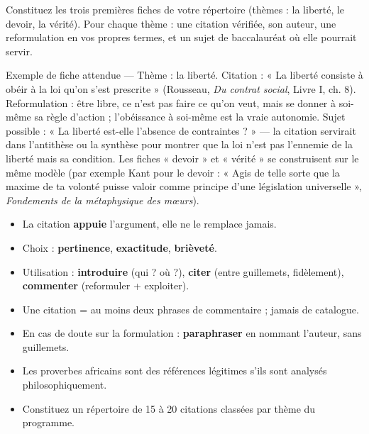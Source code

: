 \documentclass[11pt]{article}
\begin{document}
\begin{exercice}
Constituez les trois premières fiches de votre répertoire (thèmes : la liberté, le devoir, la vérité). Pour chaque thème : une citation vérifiée, son auteur, une reformulation en vos propres termes, et un sujet de baccalauréat où elle pourrait servir.
\end{exercice}

\begin{corrige}
Exemple de fiche attendue — Thème : la liberté. Citation : « La liberté consiste à obéir à la loi qu'on s'est prescrite » (Rousseau, \emph{Du contrat social}, Livre I, ch. 8). Reformulation : être libre, ce n'est pas faire ce qu'on veut, mais se donner à soi-même sa règle d'action ; l'obéissance à soi-même est la vraie autonomie. Sujet possible : « La liberté est-elle l'absence de contraintes ? » — la citation servirait dans l'antithèse ou la synthèse pour montrer que la loi n'est pas l'ennemie de la liberté mais sa condition. Les fiches « devoir » et « vérité » se construisent sur le même modèle (par exemple Kant pour le devoir : « Agis de telle sorte que la maxime de ta volonté puisse valoir comme principe d'une législation universelle », \emph{Fondements de la métaphysique des mœurs}).
\end{corrige}

\begin{aretenir}[Bilan du TP 4]
\begin{itemize}
\item La citation \textbf{appuie} l'argument, elle ne le remplace jamais.
\item Choix : \textbf{pertinence}, \textbf{exactitude}, \textbf{brièveté}.
\item Utilisation : \textbf{introduire} (qui ? où ?), \textbf{citer} (entre guillemets, fidèlement), \textbf{commenter} (reformuler + exploiter).
\item Une citation = au moins deux phrases de commentaire ; jamais de catalogue.
\item En cas de doute sur la formulation : \textbf{paraphraser} en nommant l'auteur, sans guillemets.
\item Les proverbes africains sont des références légitimes s'ils sont analysés philosophiquement.
\item Constituez un répertoire de 15 à 20 citations classées par thème du programme.
\end{itemize}
\end{aretenir}
\end{document}
